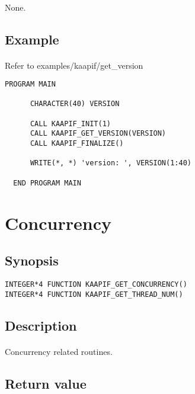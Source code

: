 \documentclass[a4paper, 11pt]{article}
\begin{document}
\paragraph{}
None.

\subsection{Example}
\paragraph{}
Refer to examples/kaapif/get\_version\\
\begin{small}
\begin{lstlisting}[frame=tb]
   PROGRAM MAIN

      CHARACTER(40) VERSION

      CALL KAAPIF_INIT(1)
      CALL KAAPIF_GET_VERSION(VERSION)
      CALL KAAPIF_FINALIZE()

      WRITE(*, *) 'version: ', VERSION(1:40)

  END PROGRAM MAIN
\end{lstlisting}
\end{small}


\newpage
\section{Concurrency}

\subsection{Synopsis}
\begin{small}
\lstset{language=C}
\begin{lstlisting}[frame=tb]
INTEGER*4 FUNCTION KAAPIF_GET_CONCURRENCY()
INTEGER*4 FUNCTION KAAPIF_GET_THREAD_NUM()
\end{lstlisting}
\end{small}

\subsection{Description}
\paragraph{}
Concurrency related routines.

\subsection{Return value}
\end{document}
